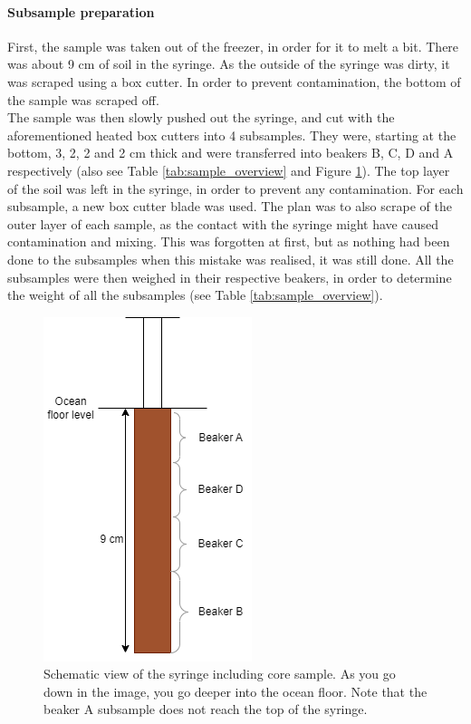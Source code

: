 \documentclass[twocolumn,a4paper,aps,amsmath,amssymb,floatfix,superscriptaddress]{revtex4-2}
\begin{document}
	\paragraph{Subsample preparation}
	First, the sample was taken out of the freezer, in order for it to melt a bit. There was about 9 cm of soil in the syringe. As the outside of the syringe was dirty, it was scraped using a box cutter. In order to prevent contamination, the bottom of the sample was scraped off. \\
	The sample was then slowly pushed out the syringe, and cut with the aforementioned heated box cutters into 4 subsamples. They were, starting at the bottom, 3, 2, 2 and 2 cm thick and were transferred into beakers B, C, D and A respectively (also see Table \ref{tab:sample_overview} and Figure \ref{fig:core-schematic}). The top layer of the soil was left in the syringe, in order to prevent any contamination. For each subsample, a new box cutter blade was used. The plan was to also scrape of the outer layer of each sample, as the contact with the syringe might have caused contamination and mixing. This was forgotten at first, but as nothing had been done to the subsamples when this mistake was realised, it was still done. All the subsamples were then weighed in their respective beakers, in order to determine the weight of all the subsamples (see Table \ref{tab:sample_overview}).\\
	\begin{figure}[t!]
		\centering
		\includegraphics[width=0.7\linewidth]{"Images/Core schematic"}
		\caption{Schematic view of the syringe including core sample. As you go down in the image, you go deeper into the ocean floor. Note that the beaker A subsample does not reach the top of the syringe.}
		\label{fig:core-schematic}
	\end{figure}
	
\end{document}
